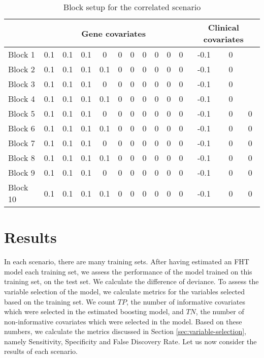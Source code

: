 \begin{table}
\caption{Block setup for the correlated scenario}
\label{table:block-setup}
\centering
\begin{tabular}{l|cccccccccc|ccc|}
\toprule
 & \multicolumn{10}{c}{Gene covariates} & \multicolumn{3}{c}{Clinical covariates}  \\
\hline
Block 1 &  0.1 & 0.1 & 0.1 & 0   & 0 & 0 & 0 & 0 & 0 & 0 & -0.1 & 0 &   \\
Block 2 &  0.1 & 0.1 & 0.1 & 0.1 & 0 & 0 & 0 & 0 & 0 & 0 & -0.1 & 0 &   \\
Block 3 &  0.1 & 0.1 & 0.1 & 0   & 0 & 0 & 0 & 0 & 0 & 0 & -0.1 & 0 &   \\
Block 4 &  0.1 & 0.1 & 0.1 & 0.1 & 0 & 0 & 0 & 0 & 0 & 0 & -0.1 & 0 &   \\
Block 5 &  0.1 & 0.1 & 0.1 & 0   & 0 & 0 & 0 & 0 & 0 & 0 & -0.1 & 0 & 0 \\
Block 6 &  0.1 & 0.1 & 0.1 & 0.1 & 0 & 0 & 0 & 0 & 0 & 0 & -0.1 & 0 & 0 \\
Block 7 &  0.1 & 0.1 & 0.1 & 0   & 0 & 0 & 0 & 0 & 0 & 0 & -0.1 & 0 & 0 \\
Block 8 &  0.1 & 0.1 & 0.1 & 0.1 & 0 & 0 & 0 & 0 & 0 & 0 & -0.1 & 0 & 0 \\
Block 9 &  0.1 & 0.1 & 0.1 & 0   & 0 & 0 & 0 & 0 & 0 & 0 & -0.1 & 0 & 0 \\
Block 10&  0.1 & 0.1 & 0.1 & 0.1 & 0 & 0 & 0 & 0 & 0 & 0 & -0.1 & 0 & 0 \\
\bottomrule
\end{tabular}
\end{table}


\section{Results}
In each scenario, there are many training sets.
After having estimated an FHT model each training set, we assess the performance of the model trained on this training set, on the test set.
We calculate the difference of deviance.
To assess the variable selection of the model, we calculate metrics for the variables selected based on the training set.
We count $TP$, the number of informative covariates which were selected in the estimated boosting model, and $TN$, the number of non-informative covariates which were selected in the model.
Based on these numbers, we calculate the metrics discussed in Section \ref{sec:variable-selection}, namely Sensitivity, Specificity and False Discovery Rate.
Let us now consider the results of each scenario.

